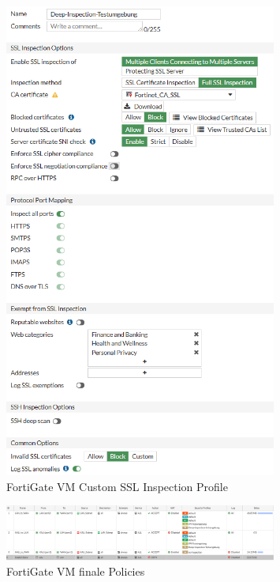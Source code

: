 \documentclass[12pt]{scrreprt}
\begin{document}
\begin{thebibliography}{99}
\begin{figure}[htbp]
	\centering
	\includegraphics[width=0.8\textwidth]{forti-SSL.png}
	\caption{FortiGate VM Custom SSL Inspection Profile}
	\label{fig:forti-SSL} %
\end{figure}

\begin{figure}[htbp]
	\centering
	\includegraphics[width=0.8\textwidth]{forti-Policies02.png}
	\caption{FortiGate VM finale Policies}
	\label{fig:forti-Policies02} %
\end{figure}












\end{thebibliography}
\end{document}
